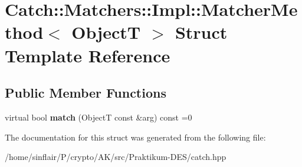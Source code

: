 \hypertarget{structCatch_1_1Matchers_1_1Impl_1_1MatcherMethod}{}\section{Catch\+:\+:Matchers\+:\+:Impl\+:\+:Matcher\+Method$<$ ObjectT $>$ Struct Template Reference}
\label{structCatch_1_1Matchers_1_1Impl_1_1MatcherMethod}
\subsection*{Public Member Functions}
\begin{DoxyCompactItemize}
\item 
\mbox{\label{structCatch_1_1Matchers_1_1Impl_1_1MatcherMethod_ae0920ff9e817acf08e1bb0cbcb044e30}} 
virtual bool {\bfseries match} (ObjectT const \&arg) const =0
\end{DoxyCompactItemize}


The documentation for this struct was generated from the following file\+:\begin{DoxyCompactItemize}
\item 
/home/sinflair/\+P/crypto/\+A\+K/src/\+Praktikum-\/\+D\+E\+S/catch.\+hpp\end{DoxyCompactItemize}
